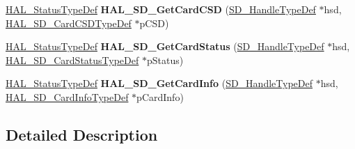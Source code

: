 \begin{DoxyCompactItemize}
\mbox{\hyperlink{stm32f7xx__hal__def_8h_a63c0679d1cb8b8c684fbb0632743478f}{H\+A\+L\+\_\+\+Status\+Type\+Def}} {\bfseries H\+A\+L\+\_\+\+S\+D\+\_\+\+Get\+Card\+C\+SD} (\mbox{\hyperlink{group___s_d___exported___types___group3_ga1f31eb64a86b0c740bb5c02fa4c9914d}{S\+D\+\_\+\+Handle\+Type\+Def}} $\ast$hsd, \mbox{\hyperlink{struct_h_a_l___s_d___card_c_s_d_type_def}{H\+A\+L\+\_\+\+S\+D\+\_\+\+Card\+C\+S\+D\+Type\+Def}} $\ast$p\+C\+SD)
\item 
\mbox{\label{group___s_d___exported___functions___group4_ga87f73383fa9b477b920c96ff60645831}} 
\mbox{\hyperlink{stm32f7xx__hal__def_8h_a63c0679d1cb8b8c684fbb0632743478f}{H\+A\+L\+\_\+\+Status\+Type\+Def}} {\bfseries H\+A\+L\+\_\+\+S\+D\+\_\+\+Get\+Card\+Status} (\mbox{\hyperlink{group___s_d___exported___types___group3_ga1f31eb64a86b0c740bb5c02fa4c9914d}{S\+D\+\_\+\+Handle\+Type\+Def}} $\ast$hsd, \mbox{\hyperlink{struct_h_a_l___s_d___card_status_type_def}{H\+A\+L\+\_\+\+S\+D\+\_\+\+Card\+Status\+Type\+Def}} $\ast$p\+Status)
\item 
\mbox{\label{group___s_d___exported___functions___group4_gab783bcbd433b03dd394308ec98e0fb88}} 
\mbox{\hyperlink{stm32f7xx__hal__def_8h_a63c0679d1cb8b8c684fbb0632743478f}{H\+A\+L\+\_\+\+Status\+Type\+Def}} {\bfseries H\+A\+L\+\_\+\+S\+D\+\_\+\+Get\+Card\+Info} (\mbox{\hyperlink{group___s_d___exported___types___group3_ga1f31eb64a86b0c740bb5c02fa4c9914d}{S\+D\+\_\+\+Handle\+Type\+Def}} $\ast$hsd, \mbox{\hyperlink{struct_h_a_l___s_d___card_info_type_def}{H\+A\+L\+\_\+\+S\+D\+\_\+\+Card\+Info\+Type\+Def}} $\ast$p\+Card\+Info)
\end{DoxyCompactItemize}


\subsection{Detailed Description}
